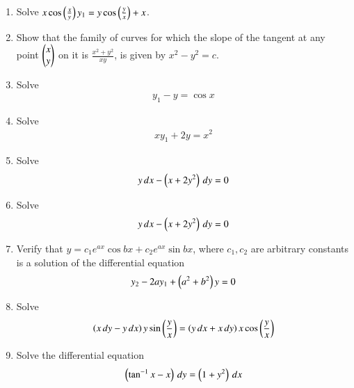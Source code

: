 \begin{enumerate}[label=\arabic*.,ref=\thesubsection.\theenumi]
\item Solve $x \cos\left(\frac{x}{y}\right)y_1 = y\cos\left(\frac{y}{x}\right)+x$.
\item Show that the family of curves for which the slope of the tangent at any point $\begin{pmatrix}x\\y\end{pmatrix}$ on it is $\frac{x^2+y^2}{xy}$, is given by $x^2-y^2 = c$.
%
%
\item Solve 
%
\begin{align}
y_1  - y = \cos x
\end{align}
%
\item Solve 
%
\begin{align}
xy_1  + 2y = x^2
\end{align}
%
\item Solve
%
\begin{align}
y\, dx - \left(x+2y^2\right)\, dy = 0
\end{align}
%
\item Solve
%
\begin{align}
y\, dx - \left(x+2y^2\right)\, dy = 0
\end{align}
%
\item Verify that $y = c_1e^{ax}\cos bx + c_2 e^{ax}\sin bx$, where $c_1,c_2$ are arbitrary constants is a solution of the differential equation
%
\begin{align}
y_2 - 2ay_1 +\left(a^2+b^2\right) y = 0
\end{align}
%
\item Solve
%
\begin{align}
\left(x\,dy-y\,dx\right)y\sin\left(\frac{y}{x}\right) = \left(y\, dx + x\, dy\right)x\cos\left(\frac{y}{x}\right)
\end{align}
%
\item Solve the differential equation
%
\begin{align}
\left(\tan^{-1}x - x\right)\, dy = \left(1+y^2\right)\, dx
\end{align}

\end{enumerate}
